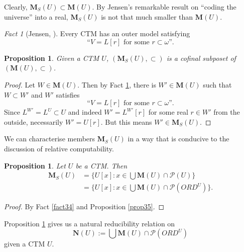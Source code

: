 \documentclass[12pt, twoside]{memoir}
\numberwithin{equation}{section}
\newtheorem{prop}[thm]{Proposition}
\theoremstyle{definition}
\theoremstyle{remark}
\newtheorem{fact}[thm]{Fact}
\theoremstyle{definition}
\theoremstyle{definition}
\theoremstyle{definition}
\theoremstyle{remark}
\begin{document}
Clearly, $\mathbf{M}_{S}(U) \subset \mathbf{M}(U)$. By Jensen's remarkable result on ``coding the universe'' into a real, $\mathbf{M}_{S}(U)$ is not that much smaller than $\mathbf{M}(U)$.

\begin{fact}[Jensen, \cite{jensencoding}]\label{fact37}
Every CTM has an outer model satisfying 
\begin{equation*}
    \text{``} V = L[r] \text{ for some } r \subset \omega \text{''.}
\end{equation*}
\end{fact}

\begin{prop}
Given a CTM $U$, $(\mathbf{M}_{S}(U), \subset)$ is a cofinal subposet of $(\mathbf{M}(U), \subset)$.
\end{prop}

\begin{proof}
Let $W \in \mathbf{M}(U)$. Then by Fact \ref{fact37}, there is $W' \in \mathbf{M}(U)$ such that $W \subset W'$ and $W'$ satisfies
\begin{equation*}
    \text{``} V = L[r] \text{ for some } r \subset \omega \text{''.}
\end{equation*}
Since $L^{W'} = L^U \subset U$ and indeed $W' = L^{W'}[r]$ for some real $r \in W'$ from the outside, necessarily $W' = U[r]$. But this means $W' \in \mathbf{M}_{S}(U)$.
\end{proof}

We can characterise members $\mathbf{M}_{S}(U)$ in a way that is conducive to the discussion of relative computability.

\begin{prop}\label{prop37}
Let $U$ be a CTM. Then
\begin{align*}
    \mathbf{M}_{S}(U) & = \{U[x] : x \in \bigcup \mathbf{M}(U) \cap \mathcal{P}(U)\} \\
    & = \{U[x] : x \in \bigcup \mathbf{M}(U) \cap \mathcal{P}(ORD^U)\} \text{.}
\end{align*}
\end{prop}

\begin{proof}
By Fact \ref{fact34} and Proposition \ref{prop35}.
\end{proof}

Proposition \ref{prop37} gives us a natural reducibility relation on 
\begin{equation*}
    \mathbf{N}(U) := \bigcup \mathbf{M}(U) \cap \mathcal{P}(ORD^U)
\end{equation*}
given a CTM $U$. 
\end{document}
